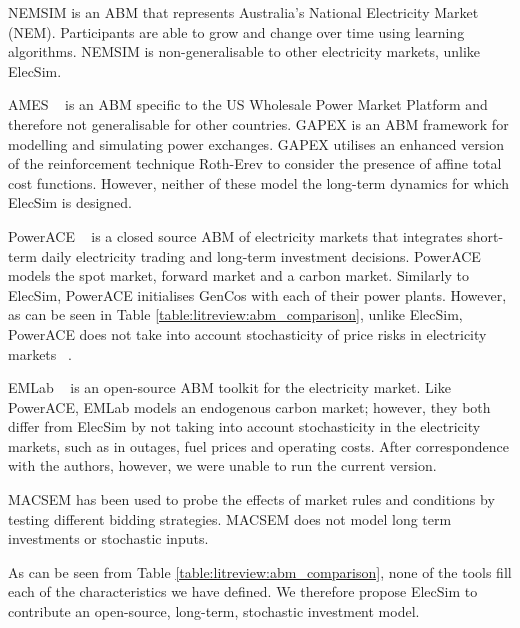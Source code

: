 NEMSIM \cite{Grozev2005} is an ABM that represents Australia's National Electricity Market (NEM). Participants are able to grow and change over time using learning algorithms. NEMSIM is non-generalisable to other electricity markets, unlike ElecSim.

AMES ~\cite{Sun2007} is an ABM specific to the US Wholesale Power Market Platform and therefore not generalisable for other countries. GAPEX \cite{Cincotti2013} is an ABM framework for modelling and simulating power exchanges. GAPEX utilises an enhanced version of the reinforcement technique Roth-Erev \cite{RothAE1995} to consider the presence of affine total cost functions. However, neither of these model the long-term dynamics for which ElecSim is designed.

PowerACE ~\cite{Rothengatter2007} is a closed source ABM of electricity markets that integrates short-term daily electricity trading and long-term investment decisions. PowerACE models the spot market, forward market and a carbon market. Similarly to ElecSim, PowerACE initialises GenCos with each of their power plants. However, as can be seen in Table \ref{table:litreview:abm_comparison}, unlike ElecSim, PowerACE does not take into account stochasticity of price risks in electricity markets ~\cite{Most2010}.

EMLab ~\cite{Chappin2017} is an open-source ABM toolkit for the electricity market. Like PowerACE, EMLab models an endogenous carbon market; however, they both differ from ElecSim by not taking into account stochasticity in the electricity markets, such as in outages, fuel prices and operating costs. After correspondence with the authors, however, we were unable to run the current version.

MACSEM \cite{Praca2003} has been used to probe the effects of market rules and conditions by testing different bidding strategies. MACSEM does not model long term investments or stochastic inputs.


As can be seen from Table \ref{table:litreview:abm_comparison}, none of the tools fill each of the characteristics we have defined. We therefore propose ElecSim to contribute an open-source, long-term, stochastic investment model. 

